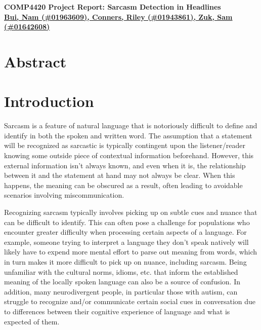 \documentclass[11pt]{article}
\def\proptitle{COMP4420 Project Report: Sarcasm Detection in Headlines}
\def\propauthors{Bui, Nam (\#01963609), 
                 Conners, Riley (\#01943861), 
                 Zuk, Sam (\#01642608)}
\begin{document}
\begin{center}
    \textbf{\Large{\proptitle}} \\
    \textbf{\underline{\propauthors}}
\end{center}

\bigskip

\section{Abstract}

\section{Introduction}

Sarcasm is a feature of natural language that is notoriously difficult to
define and identify in both the spoken and written word. The assumption that a
statement will be recognized as sarcastic is typically contingent upon the
listener/reader knowing some outside piece of contextual information
beforehand. However, this external information isn't always known, and even
when it is, the relationship between it and the statement at hand may not
always be clear. When this happens, the meaning can be obscured as a result,
often leading to avoidable scenarios involving miscommunication.

Recognizing sarcasm typically involves picking up on subtle cues and nuance
that can be difficult to identify. This can often pose a challenge for
populations who encounter greater difficulty when processing certain aspects of
a language. For example, someone trying to interpret a language they don't
speak natively will likely have to expend more mental effort to parse out
meaning from words, which in turn makes it more difficult to pick up on nuance,
including sarcasm. Being unfamiliar with the cultural norms, idioms, etc. that
inform the established meaning of the locally spoken language can also be a
source of confusion. In addition, many neurodivergent people, in particular
those with autism, can struggle to recognize and/or communicate certain social
cues in conversation due to differences between their cognitive experience of
language and what is expected of them.
\end{document}
